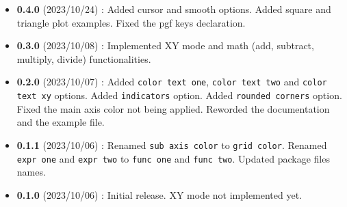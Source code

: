 \documentclass[11pt,a4paper,usenames,dvipsnames]{article}
\begin{document}
\begin{itemize}
    \item \textbf{0.4.0} (2023/10/24) :
          \subitem Added cursor and smooth options.
          \subitem Added square and triangle plot examples.
          \subitem Fixed the pgf keys declaration.
    \item \textbf{0.3.0} (2023/10/08) :
          \subitem Implemented XY mode and math (add, subtract, multiply, divide) functionalities.
    \item \textbf{0.2.0} (2023/10/07) :
          \subitem Added \texttt{color text one}, \texttt{color text two} and \texttt{color text xy} options.
          \subitem Added \texttt{indicators} option.
          \subitem Added \texttt{rounded corners} option.
          \subitem Fixed the main axis color not being applied.
          \subitem Reworded the documentation and the example file.
    \item \textbf{0.1.1} (2023/10/06) :
          \subitem Renamed \texttt{sub axis color} to \texttt{grid color}.
          \subitem Renamed \texttt{expr one} and \texttt{expr two} to \texttt{func one} and \texttt{func two}.
          \subitem Updated package files names.
    \item \textbf{0.1.0} (2023/10/06) : Initial release. XY mode not implemented yet.
\end{itemize}
\end{document}
